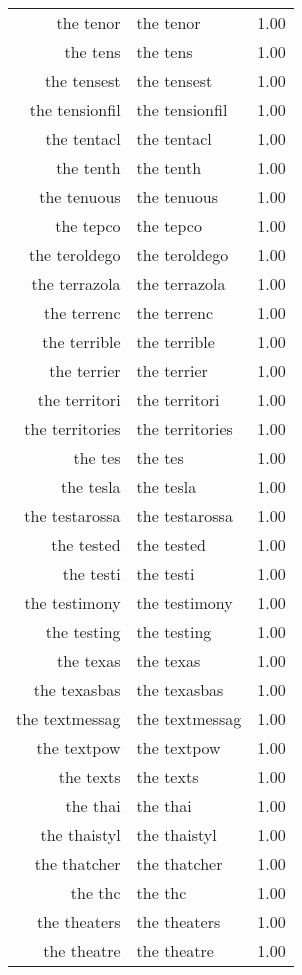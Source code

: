 \begin{table}[ht]
\begin{tabular}{rlr}
  the tenor & the tenor & 1.00 \\ 
  the tens & the tens & 1.00 \\ 
  the tensest & the tensest & 1.00 \\ 
  the tensionfil & the tensionfil & 1.00 \\ 
  the tentacl & the tentacl & 1.00 \\ 
  the tenth & the tenth & 1.00 \\ 
  the tenuous & the tenuous & 1.00 \\ 
  the tepco & the tepco & 1.00 \\ 
  the teroldego & the teroldego & 1.00 \\ 
  the terrazola & the terrazola & 1.00 \\ 
  the terrenc & the terrenc & 1.00 \\ 
  the terrible & the terrible & 1.00 \\ 
  the terrier & the terrier & 1.00 \\ 
  the territori & the territori & 1.00 \\ 
  the territories & the territories & 1.00 \\ 
  the tes & the tes & 1.00 \\ 
  the tesla & the tesla & 1.00 \\ 
  the testarossa & the testarossa & 1.00 \\ 
  the tested & the tested & 1.00 \\ 
  the testi & the testi & 1.00 \\ 
  the testimony & the testimony & 1.00 \\ 
  the testing & the testing & 1.00 \\ 
  the texas & the texas & 1.00 \\ 
  the texasbas & the texasbas & 1.00 \\ 
  the textmessag & the textmessag & 1.00 \\ 
  the textpow & the textpow & 1.00 \\ 
  the texts & the texts & 1.00 \\ 
  the thai & the thai & 1.00 \\ 
  the thaistyl & the thaistyl & 1.00 \\ 
  the thatcher & the thatcher & 1.00 \\ 
  the thc & the thc & 1.00 \\ 
  the theaters & the theaters & 1.00 \\ 
  the theatre & the theatre & 1.00 \\ 

\end{tabular}
\end{table}
